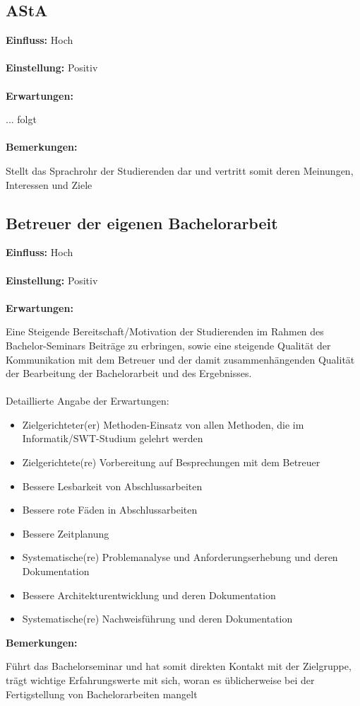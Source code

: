 \documentclass{scrreprt}
\begin{document}
\subsection{AStA}
\textbf{Einfluss:} Hoch\\\\
\textbf{Einstellung:} Positiv\\\\
\textbf{Erwartungen:}\par ... folgt\\\\
\textbf{Bemerkungen:}\par Stellt das Sprachrohr der Studierenden dar und vertritt somit deren Meinungen, Interessen und Ziele
\newpage

\subsection{Betreuer der eigenen Bachelorarbeit}
\textbf{Einfluss:} Hoch\\\\
\textbf{Einstellung:} Positiv\\\\
\textbf{Erwartungen:}\par Eine Steigende Bereitschaft/Motivation der Studierenden im Rahmen des Bachelor-Seminars Beiträge zu erbringen, sowie eine steigende Qualität der Kommunikation mit dem Betreuer und der damit zusammenhängenden Qualität der Bearbeitung der Bachelorarbeit und des Ergebnisses.
\\\\Detaillierte Angabe der Erwartungen:
\begin{itemize}
\item Zielgerichteter(er) Methoden-Einsatz von allen Methoden, die im Informatik/SWT-Studium gelehrt werden
\item Zielgerichtete(re) Vorbereitung auf Besprechungen mit dem Betreuer
\item Bessere Lesbarkeit von Abschlussarbeiten
\item Bessere \glqq rote Fäden\grqq{} in Abschlussarbeiten
\item Bessere Zeitplanung
\item Systematische(re) Problemanalyse und Anforderungserhebung und deren Dokumentation
\item Bessere Architekturentwicklung und deren Dokumentation
\item Systematische(re) Nachweisführung und deren Dokumentation
\end{itemize}
\textbf{Bemerkungen:}\par Führt das Bachelorseminar und hat somit direkten Kontakt mit der Zielgruppe, trägt wichtige Erfahrungswerte mit sich, woran es üblicherweise bei der Fertigstellung von Bachelorarbeiten mangelt
\newpage
\end{document}
